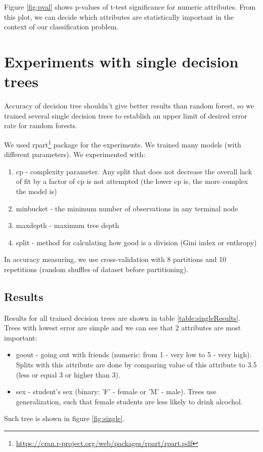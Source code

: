 \documentclass[a4paper]{article}
\begin{document}
\begin{multicols}{2}
Figure \ref{fig:pval} shows p-values of t-test significance for numeric attributes.
From this plot, we can decide which attributes are statistically important
in the context of our classification problem.



\section{Experiments with single decision trees}
\label{expSingle}

Accuracy of decision tree shouldn't give better results than random forest,
so we trained several single decision trees to establish
an upper limit of desired error rate for random forests.

We used rpart\footnote{\url{https://cran.r-project.org/web/packages/rpart/rpart.pdf}} package for the experiments.
We trained many models (with different parameters).
We experimented with:
\begin{enumerate}
    \item cp - complexity parameter.
        Any split that does not decrease the overall lack of fit by a factor of cp is not attempted
        (the lower cp is, the more complex the model is)
    \item minbucket - the minimum number of observations in any terminal node
    \item maxdepth - maximum tree depth
    \item split - method for calculating how good is a division (Gini index or enthropy)
\end{enumerate}
In accuracy measuring, we use cross-validation with 8 partitions
and 10 repetitions (random shuffles of dataset before partitioning).
% 
\subsection{Results}
\label{singleConc}

Results for all trained decision trees are shown in table \ref{table:singleResults}.
Trees with lowest error are simple and we can see that 2 attributes are most important:
\begin{itemize}
    \item goout - going out with friends (numeric: from 1 - very low to 5 - very high).
        Splits with this attribute are done by comparing value of this attribute to 3.5
        (less or equal 3 or higher than 3).
    \item sex - student's sex (binary: 'F' - female or 'M' - male).
        Trees use generalization, such that female students are less likely to drink alcochol.
\end{itemize}
Such tree is shown in figure \ref{fig:single}.


\end{multicols}
\end{document}
